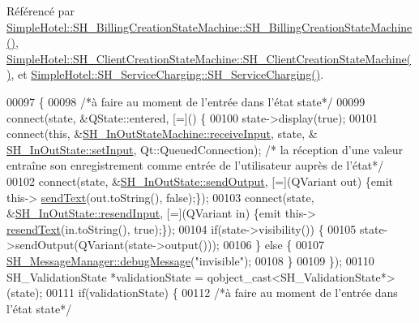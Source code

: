 Référencé par \hyperlink{classSimpleHotel_1_1SH__BillingCreationStateMachine_a8c7d39e11d0ced1fd9c27a5550465b86}{Simple\-Hotel\-::\-S\-H\-\_\-\-Billing\-Creation\-State\-Machine\-::\-S\-H\-\_\-\-Billing\-Creation\-State\-Machine()}, \hyperlink{classSimpleHotel_1_1SH__ClientCreationStateMachine_a301eb77d9ad72102d5fa8952980cf8a3}{Simple\-Hotel\-::\-S\-H\-\_\-\-Client\-Creation\-State\-Machine\-::\-S\-H\-\_\-\-Client\-Creation\-State\-Machine()}, et \hyperlink{classSimpleHotel_1_1SH__ServiceCharging_ae82c86c7e955f0dc93cdfc3603789b87}{Simple\-Hotel\-::\-S\-H\-\_\-\-Service\-Charging\-::\-S\-H\-\_\-\-Service\-Charging()}.


\begin{DoxyCode}
00097 \{
00098     \textcolor{comment}{/*à faire au moment de l'entrée dans l'état state*/}
00099     connect(state, &QState::entered, [=]() \{
00100         state->display(\textcolor{keyword}{true});
00101         connect(\textcolor{keyword}{this}, &\hyperlink{classSimpleHotel_1_1SH__InOutStateMachine_a17482446bbf0327e84feb5d6a1a612f0}{SH\_InOutStateMachine::receiveInput}, state, &
      \hyperlink{classSimpleHotel_1_1SH__InOutState_a30d45824ca3c749427ac8d40479cf072}{SH\_InOutState::setInput}, Qt::QueuedConnection); \textcolor{comment}{/* la réception d'une valeur
       entraîne son enregistrement comme entrée de l'utilisateur auprès de l'état*/}
00102         connect(state, &\hyperlink{classSimpleHotel_1_1SH__InOutState_a6f39ba3a9682ece4a0d2c96e8f8983a0}{SH\_InOutState::sendOutput}, [=](QVariant out) \{emit this->
      \hyperlink{classSimpleHotel_1_1SH__InOutStateMachine_ae81d4a51fcd3277ebfc11af978b74c0b}{sendText}(out.toString(), \textcolor{keyword}{false});\});
00103         connect(state, &\hyperlink{classSimpleHotel_1_1SH__InOutState_ab259648430e9e6e0667e79398c68c0d9}{SH\_InOutState::resendInput}, [=](QVariant in) \{emit this->
      \hyperlink{classSimpleHotel_1_1SH__InOutStateMachine_a5db6f59d446182ab9f10e0ccb0399915}{resendText}(in.toString(), \textcolor{keyword}{true});\});
00104         \textcolor{keywordflow}{if}(state->visibility()) \{
00105             state->sendOutput(QVariant(state->output()));
00106         \} \textcolor{keywordflow}{else} \{
00107             \hyperlink{classSimpleHotel_1_1SH__MessageManager_ad680f823897b7bf70e46ee18326c08b2}{SH\_MessageManager::debugMessage}(\textcolor{stringliteral}{"invisible"});
00108         \}
00109     \});
00110     SH\_ValidationState *validationState = qobject\_cast<SH\_ValidationState*>(state);
00111     \textcolor{keywordflow}{if}(validationState) \{
00112         \textcolor{comment}{/*à faire au moment de l'entrée dans l'état state*/}

\end{DoxyCode}
